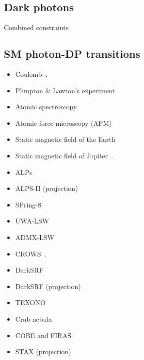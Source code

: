 \documentclass[9pt,twocolumn]{extarticle}
\begin{document}
\begin{mdframed}
\section{Dark photons}\vspace{-0.5em}
Combined constraints~\cite{Caputo:2021eaa}
\subsection*{SM photon-DP transitions}\vspace{-0.5em}
\begin{itemize}\setlength\itemsep{-0.5em}
\item Coulomb~\cite{Goldhaber:2008xy,Williams:1971ms,Bartlett:1988yy,Tu:2005ge,Kroff:2020zhp},
\item Plimpton \& Lawton's experiment~\cite{Plimpton:1936ont,Kroff:2020zhp}
\item Atomic spectroscopy~\cite{Jaeckel:2010xx}
\item Atomic force microscopy (AFM)~\cite{Kroff:2020zhp}
\item Static magnetic field of the Earth~\cite{Goldhaber:1971mr,Fischbach:1994ir,Marocco:2021dku}
\item Static magnetic field of Jupiter~\cite{Davis:1975mn,Marocco:2021dku}. 
\item ALPs~\cite{Ehret:2010mh}
\item ALPS-II (projection)~\cite{Bahre:2013ywa}
\item SPring-8~\cite{Inada:2013tx}
\item UWA-LSW~\cite{Povey:2010hs,Parker:2013fxa}
\item ADMX-LSW~\cite{Wagner:2010mi}
\item CROWS~\cite{Betz:2013dza}.
\item DarkSRF~\cite{Romanenko:2023irv}
\item DarkSRF (projection)~\cite{Berlin:2022hfx}
\item TEXONO~\cite{Danilov:2018bks}
\item Crab nebula~\cite{Zechlin:2008tj}
\item COBE and FIRAS~\cite{Caputo:2020bdy}
\item STAX (projection)~\cite{Miyazaki:2022kxl}
\end{itemize}



\end{mdframed}
\end{document}
